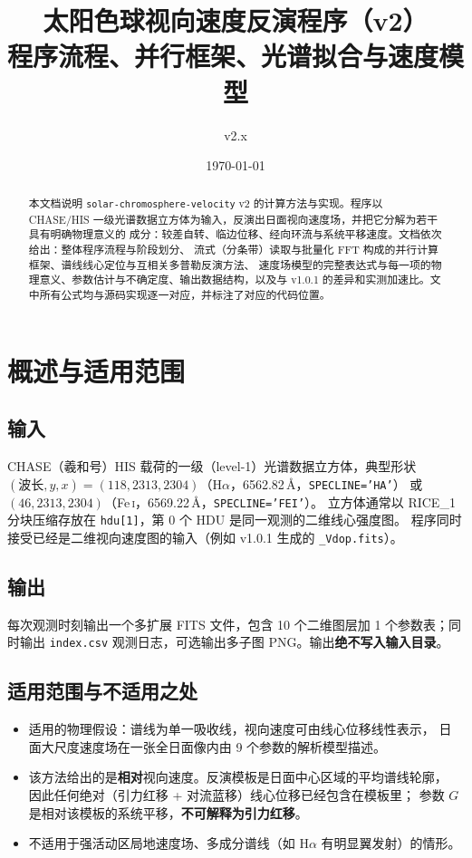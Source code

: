 \documentclass[11pt,a4paper]{ctexart}
\title{\bfseries 太阳色球视向速度反演程序（v2）\\[2mm]
       \large 程序流程、并行框架、光谱拟合与速度模型}
\author{\code{solar-chromosphere-velocity} v2.x}
\date{\today}
\newcommand{\code}[1]{\texttt{\small #1}}
\begin{document}
\maketitle

\begin{abstract}
\noindent
本文档说明 \code{solar-chromosphere-velocity} v2 的计算方法与实现。程序以 CHASE/HIS
一级光谱数据立方体为输入，反演出日面视向速度场，并把它分解为若干具有明确物理意义的
成分：较差自转、临边位移、经向环流与系统平移速度。文档依次给出：整体程序流程与阶段划分、
流式（分条带）读取与批量化 FFT 构成的并行计算框架、谱线线心定位与互相关多普勒反演方法、
速度场模型的完整表达式与每一项的物理意义、参数估计与不确定度、输出数据结构，以及与
v1.0.1 的差异和实测加速比。文中所有公式均与源码实现逐一对应，并标注了对应的代码位置。
\end{abstract}

\tableofcontents
\vspace{4mm}

\section{概述与适用范围}

\subsection{输入}
CHASE（羲和号）HIS 载荷的一级（level-1）光谱数据立方体，典型形状
$(\text{波长}, y, x) = (118, 2313, 2304)$（H$\alpha$，6562.82\,\AA，\code{SPECLINE='HA'}）
或 $(46, 2313, 2304)$（Fe\,\textsc{i}，6569.22\,\AA，\code{SPECLINE='FEI'}）。
立方体通常以 RICE\_1 分块压缩存放在 \code{hdu[1]}，第 0 个 HDU 是同一观测的二维线心强度图。
程序同时接受已经是二维视向速度图的输入（例如 v1.0.1 生成的 \code{*\_Vdop.fits}）。

\subsection{输出}
每次观测时刻输出一个多扩展 FITS 文件，包含 10 个二维图层加 1 个参数表；同时输出
\code{index.csv} 观测日志，可选输出多子图 PNG。输出\textbf{绝不写入输入目录}。

\subsection{适用范围与不适用之处}
\begin{itemize}
  \item 适用的物理假设：谱线为单一吸收线，视向速度可由线心位移线性表示，
        日面大尺度速度场在一张全日面像内由 9 个参数的解析模型描述。
  \item 该方法给出的是\textbf{相对}视向速度。反演模板是日面中心区域的平均谱线轮廓，
        因此任何绝对（引力红移 + 对流蓝移）线心位移已经包含在模板里；
        参数 $G$ 是相对该模板的系统平移，\textbf{不可解释为引力红移}。
  \item 不适用于强活动区局地速度场、多成分谱线（如 H$\alpha$ 有明显翼发射）的情形。
\end{itemize}
\end{document}
